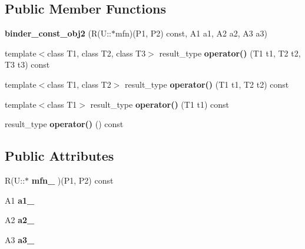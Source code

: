 \subsection*{Public Member Functions}
\begin{CompactItemize}
\item 
\textbf{binder\_\-const\_\-obj2} (R(U::$\ast$mfn)(P1, P2) const, A1 a1, A2 a2, A3 a3)\label{structam_1_1lambda_1_1binder__const__obj2_9873ba12fed8a7412dee117b234d2e33}

\item 
template$<$class T1, class T2, class T3$>$ result\_\-type \textbf{operator()} (T1 t1, T2 t2, T3 t3) const \label{structam_1_1lambda_1_1binder__const__obj2_c3aef6197d7630ada5709194e1aaae20}

\item 
template$<$class T1, class T2$>$ result\_\-type \textbf{operator()} (T1 t1, T2 t2) const\label{structam_1_1lambda_1_1binder__const__obj2_f90471594a26cfbb747852ddd35e3ea6}

\item 
template$<$class T1$>$ result\_\-type \textbf{operator()} (T1 t1) const \label{structam_1_1lambda_1_1binder__const__obj2_bf2325d018c31f355e17c131fe34ab9e}

\item 
result\_\-type \textbf{operator()} () const\label{structam_1_1lambda_1_1binder__const__obj2_a4135f68ee3bf490d60971dda56b63a7}

\end{CompactItemize}
\subsection*{Public Attributes}
\begin{CompactItemize}
\item 
R(U::$\ast$ \textbf{mfn\_\-} )(P1, P2) const\label{structam_1_1lambda_1_1binder__const__obj2_ef7bf0d78820f6e964887b1c2eab8f32}

\item 
A1 \textbf{a1\_\-}\label{structam_1_1lambda_1_1binder__const__obj2_6a8fbc8d0f93122d2c75d706b9353a95}

\item 
A2 \textbf{a2\_\-}\label{structam_1_1lambda_1_1binder__const__obj2_42ec377b810e7207534cd56d7de2a29c}

\item 
A3 \textbf{a3\_\-}\label{structam_1_1lambda_1_1binder__const__obj2_e995b5c44db3117ea27dc3a7393236e7}

\end{CompactItemize}


